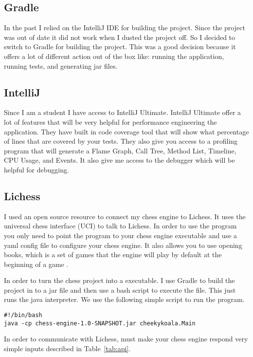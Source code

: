 \documentclass[sigconf]{acmart}
\begin{document}
\subsection{Gradle}
In the past I relied on the IntelliJ IDE for building the project.
Since the project was out of date it did not work when I dusted the project off.
So I decided to switch to Gradle for building the project.
This was a good decision because it offers a lot of different action out of the box like: running the application, running tests, and generating jar files.

\subsection{IntelliJ}
Since I am a student I have access to IntelliJ Ultimate.
IntelliJ Ultimate offer a lot of features that will be very helpful for performance engineering the application.
They have built in code coverage tool that will show what percentage of lines that are covered by your tests.
They also give you access to a profiling program that will generate a Flame Graph, Call Tree, Method List, Timeline, CPU Usage, and Events.
It also give me access to the debugger which will be helpful for debugging.

\subsection{Lichess}
I used an open source resource \cite{lichess-bot} to connect my chess engine to Lichess.
It uses the universal chess interface (UCI) \cite{uci} to talk to Lichess.
In order to use the program you only need to point the program to your chess engine executable and use a yaml config file to configure your chess engine.
It also allows you to use opening books, which is a set of games that the engine will play by default at the beginning of a game \cite{pgn}.

In order to turn the chess project into a executable.
I use Gradle to build the project in to a jar file and then use a bash script to execute the file.
This just runs the java interpreter.
We use the following simple script to run the program.
\begin{verbatim}
#!/bin/bash
java -cp chess-engine-1.0-SNAPSHOT.jar cheekykoala.Main
\end{verbatim}
In order to communicate with Lichess, must make your chess engine respond very simple inputs described in Table~\ref{tab:api}.
\end{document}
